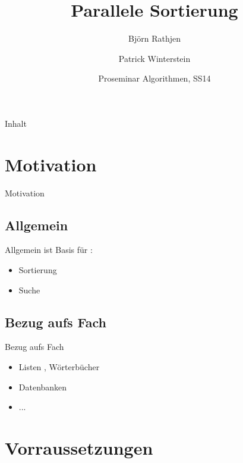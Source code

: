 \documentclass[ucs,9pt]{beamer}
\title[|| Sort] %
{Parallele Sortierung}
\author[] %
{Björn Rathjen \and Patrick Winterstein}
\institute[FU Berlin] %
{Freie Universität Berlin}
\date[ProSem Algo]
{Proseminar Algorithmen, SS14}
\begin{document}
\begin{frame}[plain]
  \titlepage
\end{frame}
 
\begin{frame}{Inhalt}
\end{frame}

\section{Motivation}
\begin{frame}{Motivation}
\end{frame}
\subsection{Allgemein}
\begin{frame}{Allgemein}
ist Basis für :
\begin{itemize}
\item Sortierung
\item Suche
\end{itemize}
\end{frame}
\subsection{Bezug aufs Fach}
\begin{frame}{Bezug aufs Fach}
\begin{itemize}
\item Listen , Wörterbücher
\item Datenbanken
\item ... 
\end{itemize}
\end{frame}
\section{Vorraussetzungen}
\end{document}

